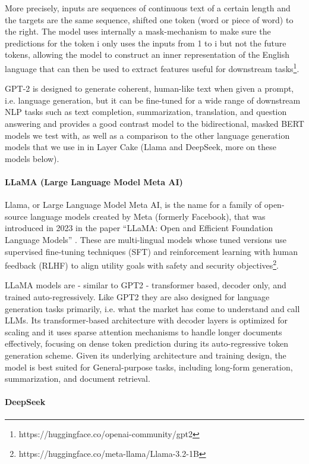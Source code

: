 \documentclass[final]{clv2025}
\begin{document}
More precisely, inputs are sequences of continuous text of a certain length and the targets are the same sequence, shifted one token (word or piece of word) to the right. The model uses internally a mask-mechanism to make sure the predictions for the token i only uses the inputs from 1 to i but not the future tokens, allowing the model to construct an inner representation of the English language that can then be used to extract features useful for downstream tasks\footnote{https://huggingface.co/openai-community/gpt2}. 

GPT-2 is designed to generate coherent, human-like text when given a prompt, i.e. language generation, but it can be fine-tuned for a wide range of downstream NLP tasks such as text completion, summarization, translation, and question answering and provides a good contrast model to the bidirectional, masked BERT models we test with, as well as a comparison to the other language generation models that we use in in Layer Cake (Llama and DeepSeek, more on these models below).

\paragraph{LLaMA (Large Language Model Meta AI)}

Llama, or Large Language Model Meta AI, is the name for a family of open-source language models created by Meta (formerly Facebook), that was introduced in 2023 in the paper “LLaMA: Open and Efficient Foundation Language Models” \cite{touvron2023llama}. These are multi-lingual models whose tuned versions use supervised fine-tuning techniques (SFT) and reinforcement learning with human feedback (RLHF) to align utility goals with safety and security objectives\footnote{https://huggingface.co/meta-llama/Llama-3.2-1B}. 

LLaMA models are - similar to GPT2 - transformer based, decoder only, and trained auto-regressively. Like GPT2 they are also designed for language generation tasks primarily, i.e. what the market has come to understand and call LLMs. Its transformer-based architecture with decoder layers is optimized for scaling and it uses sparse attention mechanisms to handle longer documents effectively, focusing on dense token prediction during its auto-regressive token generation scheme. Given its underlying architecture and training design, the model is best suited for General-purpose tasks, including long-form generation, summarization, and document retrieval.

\paragraph{DeepSeek}
\end{document}

